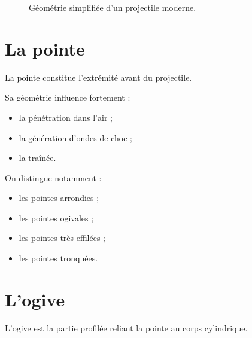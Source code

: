\begin{figure}[htbp]
\centering
{}
\caption{Géométrie simplifiée d'un projectile moderne.}
\label{fig:geometrie_projectile}
\end{figure}

\section{La pointe}

La pointe constitue l'extrémité avant du projectile.

Sa géométrie influence fortement :

\begin{itemize}
    \item la pénétration dans l'air ;
    \item la génération d'ondes de choc ;
    \item la traînée.
\end{itemize}

On distingue notamment :

\begin{itemize}
    \item les pointes arrondies ;
    \item les pointes ogivales ;
    \item les pointes très effilées ;
    \item les pointes tronquées.
\end{itemize}

\section{L'ogive}

L'ogive est la partie profilée reliant la pointe au corps cylindrique.

